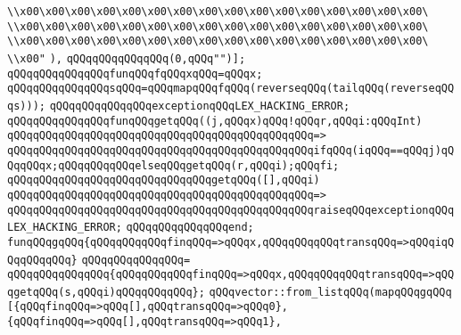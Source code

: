 \verb|\\x00\x00\x00\x00\x00\x00\x00\x00\x00\x00\x00\x00\x00\x00\x00\x00\|\newline
\verb|\\x00\x00\x00\x00\x00\x00\x00\x00\x00\x00\x00\x00\x00\x00\x00\x00\|\newline
\verb|\\x00\x00\x00\x00\x00\x00\x00\x00\x00\x00\x00\x00\x00\x00\x00\x00\|\newline
\verb|\\x00"|\newline
\verb|),|\newline
\verb|qQQqqQQqqQQqqQQq(0,qQQq"")];|\newline
\verb|qQQqqQQqqQQqqQQqfunqQQqfqQQqxqQQq=qQQqx;|\newline
\verb|qQQqqQQqqQQqqQQqsqQQq=qQQqmapqQQqfqQQq(reverseqQQq(tailqQQq(reverseqQQqs)));|\newline
\verb|qQQqqQQqqQQqqQQqexceptionqQQqLEX_HACKING_ERROR;|\newline
\verb|qQQqqQQqqQQqqQQqfunqQQqgetqQQq((j,qQQqx)qQQq!qQQqr,qQQqi:qQQqInt)|\newline
\verb|qQQqqQQqqQQqqQQqqQQqqQQqqQQqqQQqqQQqqQQqqQQqqQQq=>|\newline
\verb|qQQqqQQqqQQqqQQqqQQqqQQqqQQqqQQqqQQqqQQqqQQqqQQqifqQQq(iqQQq==qQQqj)qQQqqQQqx;qQQqqQQqqQQqelseqQQqgetqQQq(r,qQQqi);qQQqfi;|\newline
\newline
\verb|qQQqqQQqqQQqqQQqqQQqqQQqqQQqqQQqgetqQQq([],qQQqi)|\newline
\verb|qQQqqQQqqQQqqQQqqQQqqQQqqQQqqQQqqQQqqQQqqQQqqQQq=>|\newline
\verb|qQQqqQQqqQQqqQQqqQQqqQQqqQQqqQQqqQQqqQQqqQQqqQQqraiseqQQqexceptionqQQqLEX_HACKING_ERROR;|\newline
\verb|qQQqqQQqqQQqqQQqend;|\newline
\verb|funqQQqgqQQq{qQQqqQQqqQQqfinqQQq=>qQQqx,qQQqqQQqqQQqtransqQQq=>qQQqiqQQqqQQqqQQq}|\newline
\verb|qQQqqQQqqQQqqQQq=|\newline
\verb|qQQqqQQqqQQqqQQq{qQQqqQQqqQQqfinqQQq=>qQQqx,qQQqqQQqqQQqtransqQQq=>qQQqgetqQQq(s,qQQqi)qQQqqQQqqQQq};|\newline
\verb|qQQqvector::from_listqQQq(mapqQQqgqQQq|\newline
\verb|[{qQQqfinqQQq=>qQQq[],qQQqtransqQQq=>qQQq0},|\newline
\verb|{qQQqfinqQQq=>qQQq[],qQQqtransqQQq=>qQQq1},|\newline
